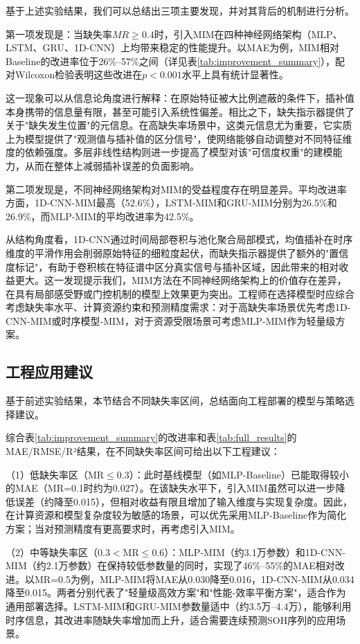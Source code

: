 \documentclass[10pt,a4paper]{ctexart}
\begin{document}
基于上述实验结果，我们可以总结出三项主要发现，并对其背后的机制进行分析。

第一项发现是：当缺失率$MR \ge 0.4$时，引入MIM在四种神经网络架构（MLP、LSTM、GRU、1D-CNN）上均带来稳定的性能提升。以MAE为例，MIM相对Baseline的改进率位于26\%--57\%之间（详见表\ref{tab:improvement_summary}），配对Wilcoxon检验表明这些改进在$p<0.001$水平上具有统计显著性。

这一现象可以从信息论角度进行解释：在原始特征被大比例遮蔽的条件下，插补值本身携带的信息量有限，甚至可能引入系统性偏差。相比之下，缺失指示器提供了关于"缺失发生位置"的元信息。在高缺失率场景中，这类元信息尤为重要，它实质上为模型提供了"观测值与插补值的区分信号"，使网络能够自动调整对不同特征维度的依赖强度。多层非线性结构则进一步提高了模型对该"可信度权重"的建模能力，从而在整体上减弱插补误差的负面影响。

第二项发现是，不同神经网络架构对MIM的受益程度存在明显差异。平均改进率方面，1D-CNN-MIM最高（52.6\%），LSTM-MIM和GRU-MIM分别为26.5\%和26.9\%，而MLP-MIM的平均改进率为42.5\%。

从结构角度看，1D-CNN通过时间局部卷积与池化聚合局部模式，均值插补在时序维度的平滑作用会削弱原始特征的细粒度起伏，而缺失指示器提供了额外的"置信度标记"，有助于卷积核在特征谱中区分真实信号与插补区域，因此带来的相对收益更大。这一发现提示我们，MIM方法在不同神经网络架构上的价值存在差异，在具有局部感受野或门控机制的模型上效果更为突出。工程师在选择模型时应综合考虑缺失率水平、计算资源约束和预测精度需求：对于高缺失率场景优先考虑1D-CNN-MIM或时序模型-MIM，对于资源受限场景可考虑MLP-MIM作为轻量级方案。

\subsection{工程应用建议}

基于前述实验结果，本节结合不同缺失率区间，总结面向工程部署的模型与策略选择建议。

综合表\ref{tab:improvement_summary}的改进率和表\ref{tab:full_results}的MAE/RMSE/R²结果，在不同缺失率区间可给出以下工程建议：

（1）低缺失率区（MR$\leq$0.3）：此时基线模型（如MLP-Baseline）已能取得较小的MAE（MR=0.1时约为0.027）。在该缺失水平下，引入MIM虽然可以进一步降低误差（约降至0.015），但相对收益有限且增加了输入维度与实现复杂度。因此，在计算资源和模型复杂度较为敏感的场景，可以优先采用MLP-Baseline作为简化方案；当对预测精度有更高要求时，再考虑引入MIM。

（2）中等缺失率区（0.3$<$MR$\leq$0.6）：MLP-MIM（约3.1万参数）和1D-CNN-MIM（约2.1万参数）在保持较低参数量的同时，实现了46\%--55\%的MAE相对改进。以MR=0.5为例，MLP-MIM将MAE从0.030降至0.016，1D-CNN-MIM从0.034降至0.015。两者分别代表了"轻量级高效方案"和"性能-效率平衡方案"，适合作为通用部署选择。LSTM-MIM和GRU-MIM参数量适中（约3.5万--4.4万），能够利用时序信息，其改进率随缺失率增加而上升，适合需要连续预测SOH序列的应用场景。
\end{document}
